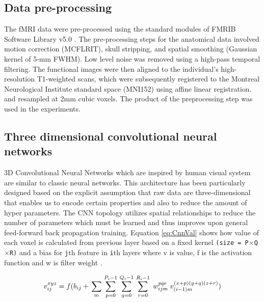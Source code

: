 \documentclass[a4paper,fleqn]{cas-dc}
\begin{document}
\subsection{Data pre-processing}
\label{section:preprocessing}
The fMRI data were pre-processed using the standard modules of FMRIB Software Library v5.0 \cite{FMRIB}. The pre-processing steps for the anatomical data involved motion correction (MCFLRIT), skull stripping, and spatial smoothing (Gaussian kernel of 5-mm FWHM). Low level noise was removed using a high-pass temporal filtering. The functional images were then aligned to the individual's high-resolution T1-weighted scans, which were subsequently registered to the Montreal Neurological Institute standard space (MNI152) using affine linear registration. and resampled at 2mm cubic voxels. The product of the preprocessing step was used in the experiments.



\subsection{Three dimensional convolutional neural networks}
\label{section:3dCnn}
3D Convolutional Neural Networks which are inspired by human visual system are similar to classic neural networks. This architecture has been particularly designed based on the explicit assumption that raw data are three-dimensional that enables us to encode certain properties and also to reduce the amount of hyper parameters. The CNN topology utilizes spatial relationships to reduce the number of parameters which must be learned and thus improves upon general feed-forward back propagation training. Equation \eqref{eq:CnnVal} shows how value of each voxel is calculated from previous layer based on a fixed kernel \texttt{(size = P$\times$Q$\times$R)} and a bias for \texttt{j}th feature in \texttt{i}th layers where v is value, f is the activation function and w is filter weight \cite{Ji2013}.

\begin{equation}
v^{ xyz }_{ ij } = \\
f(  \\
b_{ij} +  \\
\sum_m \\ 
\sum_{p=0}^{P_i-1} \\
\sum_{q=0}^{Q_i-1} \\
\sum_{r=0}^{R_i-1} \\
\; w^{pqr}_{ijm}  \\
\; v ^ { (x+p)(y+q)(z+r) }_{ (i-1)m } \\
) \label{eq:CnnVal} 
\end{equation}
\end{document}
